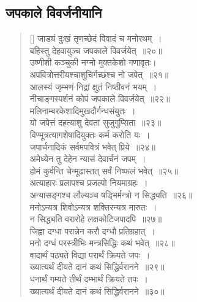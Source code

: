 \documentclass[twoside,12pt,notitlepage]{book}
\begin{document}
	\subsection*{जपकाले विवर्जनीयानि}
\begin{verse}[\versewidth]		
जाड्यं दुःखं तृणच्छेदं विवादं च मनोरथम्~।\\[-6pt]
	बहिस्तु देहवायुञ्च जपकाले विवर्जयेत्~॥२०॥\\
	उष्णीशी कञ्चुकी नग्नो मुक्तकेशो गणावृतः।\\[-6pt]
	अपवित्रोत्तरीयश्चाशुचिर्गच्छंश्च नो जपेत्~॥२१॥\footA \\
	आलस्यं जृम्भणं निद्रां क्षुतं निष्ठीवनं भयम्~।\\[-6pt]
	नीचाङ्गस्पर्शनं कोपं जपकाले विवर्जयेत्~॥२२॥\\
	मलिनाम्बरकेशादिमुखदौर्गन्धसंयुतः~।\\[-6pt]
	यो जपेत्तं दहत्याशु देवता सुजुगुप्सिता~॥२३॥\\
	विण्मूत्रत्यागशेषादियुक्तः कर्म करोति यः~।\\[-6pt]
	जपार्चनादिकं सर्वमपवित्रं भवेत् प्रिये~॥२४॥\\
	अमेध्येन तु देहेन न्यासं देवार्चनं जपम्~।\\[-6pt]
	होमं कुर्वन्ति चेन्मूढास्तत् सर्वं निष्फलं भवेत्~॥२५॥\\
	अत्याहारः प्रलापश्च प्रजल्पो नियमाग्रहः~।\\[-6pt]
	अन्यासङ्गश्च लौल्यञ्च षड्भिर्मन्त्रो न सिद्ध्यति~॥२६॥\footA \\
	मनोऽन्यत्र शिवोऽन्यत्र शक्तिरन्यत्र मारुतः~।\\[-6pt]
	न सिद्ध्यति वरारोहे लक्षकोटिजपादपि~॥२७॥\footA \\
	जिह्वा दग्धा परान्नेन करौ दग्धौ प्रतिग्रहात्~।\\[-6pt]
	मनो दग्धं परस्त्रीभिः मन्त्रसिद्धिः कथं भवेत्~॥२८॥\\
	वादार्थं पठ्यते विद्या परार्थं क्रियते जपः~।\\[-6pt]
	ख्यात्यर्थं दीयते दानं कथं सिद्धिर्वरानने~॥२९॥\\
	धनार्थं गम्यते तीर्थं दम्भार्थं क्रियते तपः~।\\[-6pt]
	ख्यात्यर्थं दीयते दानं कथं सिद्धिर्वरानने~॥३०॥
\end{verse}	
\end{document}
